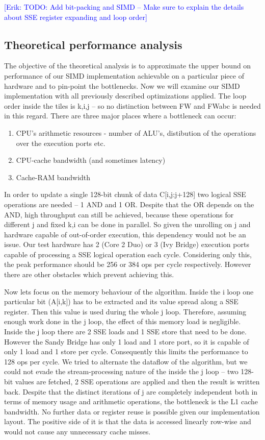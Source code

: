 \documentclass[letterpaper]{article}
\newcommand{\erik}[1]{\textcolor{blue}{[Erik: #1]}}
\begin{document}
\erik{TODO: Add bit-packing and SIMD -- Make sure to explain the details about SSE register expanding and loop order}

\subsection{Theoretical performance analysis}
The objective of the theoretical analysis is to approximate the upper bound on performance of our SIMD implementation
achievable on a particular piece of hardware and to pin-point the bottlenecks. Now we will examine our 
SIMD implementation with all previously described optimizations applied. 
The loop order inside the tiles is k,i,j -- so no distinction between FW and FWabc is needed in this regard. 
There are three major places where a bottleneck can occur:
\begin{enumerate}
\item CPU's arithmetic resources - number of ALU's, distibution of the operations over the execution ports etc. 
\item CPU-cache bandwidth (and sometimes latency)
\item Cache-RAM bandwidth
\end{enumerate}

In order to update a single 128-bit chunk of data C[i,j:j+128] two logical SSE operations are needed -- 1 AND and 1 OR. Despite that the OR depends on the AND, 
high throughput can still be achieved, because these operations for different j and fixed k,i can be done in parallel. So given the unrolling on j and hardware capable of
out-of-order execution, this dependency would not be an issue. Our test hardware has 2 (Core 2 Duo) or 3 (Ivy Bridge) execution ports capable of processing a SSE logical operation 
each cycle. Considering only this, the peak performance should be 256 or 384 ops per cycle respectively. However there are other obstacles which prevent achieving this. 

Now lets focus on the memory behaviour of the algorithm. Inside the i loop one particular bit (A[i,k]) has to be extracted and its value spread along a SSE register. Then this value is 
used during the whole j loop. Therefore, assuming enough work done in the j loop, the effect of this memory load is negligible. 
Inside the j loop there are 2 SSE loads and 1 SSE store that need to be done. However the Sandy Bridge has only 1 load and 1 store port, so it is capable of
only 1 load and 1 store per cycle. Consequently this limits the performance to 128 ops per cycle. We tried to alternate the dataflow of the algorithm, but we could not
evade the stream-processing nature of the inside the j loop -- two 128-bit values are fetched, 2 SSE operations are applied and then the result is written back. 
Despite that the distinct iterations of j are completely independent both in terms of memory usage and arithmetic operations, the 
bottleneck is the L1 cache bandwidth. No further data or register reuse is possible given our implementation layout. The positive side of it is that the data is accessed 
linearly row-wise and would not cause any unnecessary cache misses.
\end{document}
